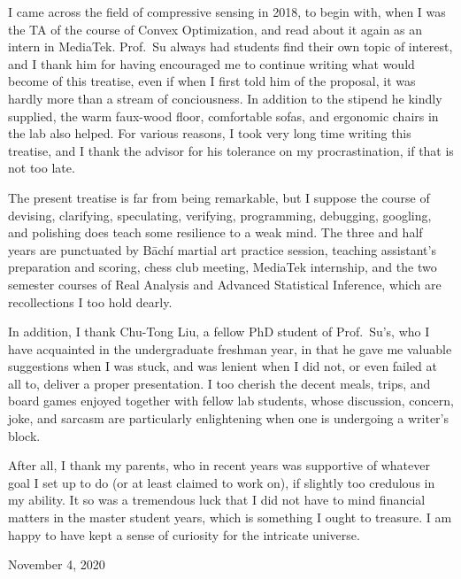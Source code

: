 \starttitle [title={Foreword}]

I came across the field of compressive sensing in 2018, to begin with, when I was the TA of the course of Convex Optimization, and read about it again as an intern in MediaTek.
Prof.\ Su always had students find their own topic of interest, and I thank him for having encouraged me to continue writing what would become of this treatise, even if when I first told him of the proposal, it was hardly more than a stream of conciousness.
In addition to the stipend he kindly supplied, the warm faux-wood floor, comfortable sofas, and ergonomic chairs in the lab also helped.
For various reasons, I took very long time writing this treatise, and I thank the advisor for his tolerance on my procrastination, if that is not too late.

The present treatise is far from being remarkable, but I suppose the course of devising, clarifying, speculating, verifying, programming, debugging, googling, and polishing does teach some resilience to a weak mind.
The three and half years are punctuated by Bāchí martial art practice session, teaching assistant's preparation and scoring, chess club meeting, MediaTek internship, and the two semester courses of Real Analysis and Advanced Statistical Inference, which are recollections I too hold dearly.

In addition, I thank Chu-Tong Liu, a fellow PhD student of Prof.\ Su's, who I have acquainted in the undergraduate freshman year, in that he gave me valuable suggestions when I was stuck, and was lenient when I did not, or even failed at all to, deliver a proper presentation.
I too cherish the decent meals, trips, and board games enjoyed together with fellow lab students, whose discussion, concern, joke, and sarcasm are particularly enlightening when one is undergoing a writer's block.

After all, I thank my parents, who in recent years was supportive of whatever goal I set up to do (or at least claimed to work on), if slightly too credulous in my ability.
It so was a tremendous luck that I did not have to mind financial matters in the master student years, which is something I ought to treasure.
I am happy to have kept a sense of curiosity for the intricate universe.

November 4, 2020

\stoptitle

